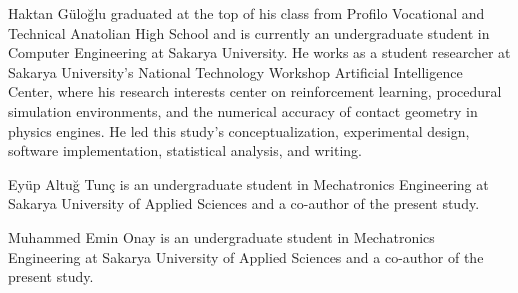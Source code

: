 \documentclass[a4paper,fleqn]{cas-sc}
\begin{document}
\printcredits




Haktan Güloğlu graduated at the top of his class from Profilo
Vocational and Technical Anatolian High School and is currently an
undergraduate student in Computer Engineering at Sakarya University. He
works as a student researcher at Sakarya University's National
Technology Workshop Artificial Intelligence Center, where his research
interests center on reinforcement learning, procedural simulation
environments, and the numerical accuracy of contact geometry in physics
engines. He led this study's conceptualization, experimental design,
software implementation, statistical analysis, and writing.
\endbio

\bio{}
Eyüp Altuğ Tunç is an undergraduate student in Mechatronics Engineering
at Sakarya University of Applied Sciences and a co-author of the
present study.
\endbio

\bio{}
Muhammed Emin Onay is an undergraduate student in Mechatronics
Engineering at Sakarya University of Applied Sciences and a co-author
of the present study.
\endbio
\end{document}
